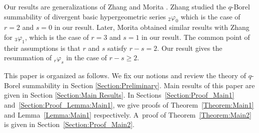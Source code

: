 \documentclass[pdftex]{sigma}
\numberwithin{equation}{section}
\begin{document}
Our results are generalizations of Zhang \cite{Zhang2002} and Morita \cite{Morita2014}. Zhang studied the $q$-Borel summability of divergent basic hypergeometric series ${}_2\varphi_0$ which is the case of $r=2$ and $s=0$ in our result. Later, Morita obtained similar results with Zhang for ${}_3\varphi_1$, which is the case of $r=3$ and $s=1$ in our result. The common point of their assumptions is that $r$ and $s$ satisfy $r-s=2$. Our result gives the resummation of ${}_r\varphi_s$ in the case of $r-s\ge2$.

This paper is organized as follows. We fix our notions and review the theory of $q$-Borel summability in Section \ref{Section:Preliminary}. Main results of this paper are given in Section \ref{Section:Main Results}. In Sections~\ref{Section:Proof_Main1} and~\ref{Section:Proof_Lemma:Main1}, we give proofs of Theorem~\ref{Theorem:Main1} and Lemma~\ref{Lemma:Main1} respectively. A~proof of Theorem~\ref{Theorem:Main2} is given in Section~\ref{Section:Proof_Main2}.
\end{document}
